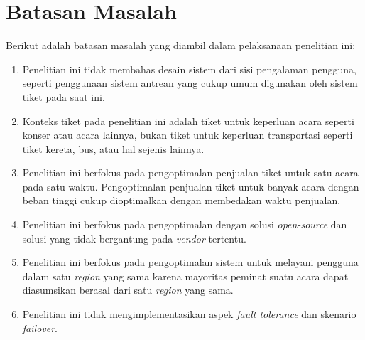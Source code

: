 \section{Batasan Masalah}
\label{sec:batasan-masalah}

Berikut adalah batasan masalah yang diambil dalam pelaksanaan penelitian ini:

\begin{enumerate}
  \item Penelitian ini tidak membahas desain sistem dari sisi pengalaman pengguna, seperti penggunaan sistem antrean yang cukup umum digunakan oleh sistem tiket pada saat ini.
  \item Konteks tiket pada penelitian ini adalah tiket untuk keperluan acara seperti konser atau acara lainnya, bukan tiket untuk keperluan transportasi seperti tiket kereta, bus, atau hal sejenis lainnya.
  \item Penelitian ini berfokus pada pengoptimalan penjualan tiket untuk satu acara pada satu waktu. Pengoptimalan penjualan tiket untuk banyak acara dengan beban tinggi cukup dioptimalkan dengan membedakan waktu penjualan.
  \item Penelitian ini berfokus pada pengoptimalan dengan solusi \textit{open-source} dan solusi yang tidak bergantung pada \textit{vendor} tertentu.
  \item Penelitian ini berfokus pada pengoptimalan sistem untuk melayani pengguna dalam satu \textit{region} yang sama karena mayoritas peminat suatu acara dapat diasumsikan berasal dari satu \textit{region} yang sama.
  \item Penelitian ini tidak mengimplementasikan aspek \textit{fault tolerance} dan skenario \textit{failover}.
\end{enumerate}

